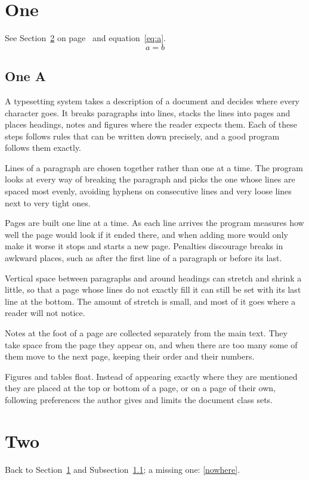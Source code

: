 \documentclass{article}
\begin{document}
\section{One}\label{sec:one}
See Section~\ref{sec:two} on page~\pageref{sec:two} and equation~\eqref{eq:a}.
\begin{equation}\label{eq:a}
a = b
\end{equation}
\subsection{One A}\label{sec:onea}
A typesetting system takes a description of a document and decides where every character goes. It breaks paragraphs into lines, stacks the lines into pages and places headings, notes and figures where the reader expects them. Each of these steps follows rules that can be written down precisely, and a good program follows them exactly.

Lines of a paragraph are chosen together rather than one at a time. The program looks at every way of breaking the paragraph and picks the one whose lines are spaced most evenly, avoiding hyphens on consecutive lines and very loose lines next to very tight ones.

Pages are built one line at a time. As each line arrives the program measures how well the page would look if it ended there, and when adding more would only make it worse it stops and starts a new page. Penalties discourage breaks in awkward places, such as after the first line of a paragraph or before its last.

Vertical space between paragraphs and around headings can stretch and shrink a little, so that a page whose lines do not exactly fill it can still be set with its last line at the bottom. The amount of stretch is small, and most of it goes where a reader will not notice.

Notes at the foot of a page are collected separately from the main text. They take space from the page they appear on, and when there are too many some of them move to the next page, keeping their order and their numbers.

Figures and tables float. Instead of appearing exactly where they are mentioned they are placed at the top or bottom of a page, or on a page of their own, following preferences the author gives and limits the document class sets.
\section{Two}\label{sec:two}
Back to Section~\ref{sec:one} and Subsection~\ref{sec:onea}; a missing one: \ref{nowhere}.
\end{document}
